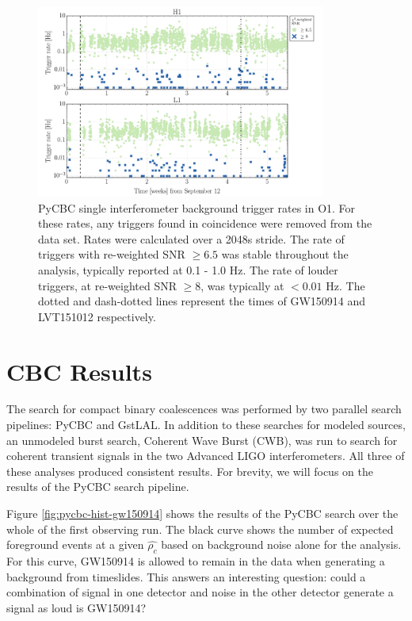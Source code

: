 \begin{figure}[ht!]%
\includegraphics[width=0.85\textwidth]{figures/O1/pycbc-rate-versus-time}
\caption[PyCBC trigger rates in O1]{PyCBC single interferometer background trigger %
         rates in O1. For these rates, any triggers found in coincidence %
         were removed from the data set. Rates were calculated over a 2048s stride. %
         The rate of triggers with %
         re-weighted SNR $\geq 6.5$ was stable throughout the analysis, typically %
         reported at 0.1 - 1.0 Hz. The rate of louder triggers, at re-weighted SNR %
         $\geq 8$, was typically at $< 0.01$ Hz. The dotted and dash-dotted lines %
         represent the times of GW150914 and LVT151012 respectively.
         }
\label{fig:pycbc-rate}
\end{figure}

\section{CBC Results}

The search for compact binary
coalescences was performed by two parallel search pipelines: PyCBC and 
GstLAL. In addition to these searches for modeled sources, an unmodeled 
burst search, Coherent Wave Burst (CWB), was run to search for coherent 
transient signals in the two Advanced LIGO interferometers. 
All three of these analyses produced consistent results. 
For brevity, we will focus on the results of the PyCBC search pipeline.

Figure \ref{fig:pycbc-hist-gw150914} shows the results of the PyCBC search 
over the whole of the first observing run. The black curve shows the 
number of expected foreground events at a given $\hat{\rho_c}$ based on 
background noise alone for the analysis. For this curve, GW150914 is 
allowed to remain in the data when generating a background from timeslides. 
This answers an interesting question: could a combination of signal in 
one detector and noise in the other detector generate a signal as loud is 
GW150914?


